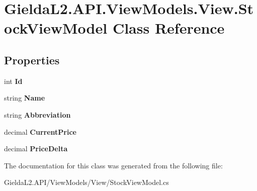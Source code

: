 \hypertarget{class_gielda_l2_1_1_a_p_i_1_1_view_models_1_1_view_1_1_stock_view_model}{}\section{Gielda\+L2.\+A\+P\+I.\+View\+Models.\+View.\+Stock\+View\+Model Class Reference}
\label{class_gielda_l2_1_1_a_p_i_1_1_view_models_1_1_view_1_1_stock_view_model}
\subsection*{Properties}
\begin{DoxyCompactItemize}
\item 
\mbox{\label{class_gielda_l2_1_1_a_p_i_1_1_view_models_1_1_view_1_1_stock_view_model_a7ca4f6c5fe2ca6988ef6259d7240ddeb}} 
int {\bfseries Id}
\item 
\mbox{\label{class_gielda_l2_1_1_a_p_i_1_1_view_models_1_1_view_1_1_stock_view_model_a5969f2db82c2f2a0f84233198c950dad}} 
string {\bfseries Name}
\item 
\mbox{\label{class_gielda_l2_1_1_a_p_i_1_1_view_models_1_1_view_1_1_stock_view_model_aa989a38e164deab715942686f252e382}} 
string {\bfseries Abbreviation}
\item 
\mbox{\label{class_gielda_l2_1_1_a_p_i_1_1_view_models_1_1_view_1_1_stock_view_model_ab250f518902e0c7809c4cc244b15fdeb}} 
decimal {\bfseries Current\+Price}
\item 
\mbox{\label{class_gielda_l2_1_1_a_p_i_1_1_view_models_1_1_view_1_1_stock_view_model_a3adadd63034ae34efd63793773e25f0d}} 
decimal {\bfseries Price\+Delta}
\end{DoxyCompactItemize}


The documentation for this class was generated from the following file\+:\begin{DoxyCompactItemize}
\item 
Gielda\+L2.\+A\+P\+I/\+View\+Models/\+View/Stock\+View\+Model.\+cs\end{DoxyCompactItemize}
